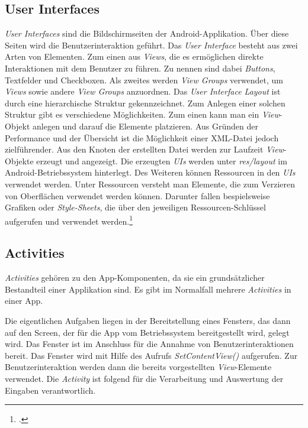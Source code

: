 \subsection{User Interfaces}
\label{ssec:android-ui}
\textit{User Interfaces} sind die Bildschirmseiten der Android-Applikation. Über diese Seiten wird die Benutzerinteraktion geführt. Das \textit{User Interface} besteht aus zwei Arten von Elementen. Zum einen aus \textit{Views}, die es ermöglichen direkte Interaktionen mit dem Benutzer zu führen. Zu nennen sind dabei \textit{Buttons}, Textfelder und Checkboxen. Als zweites werden \textit{View Groups} verwendet, um \textit{Views} sowie andere \textit{View Groups} anzuordnen.
Das \textit{User Interface Layout} ist durch eine hierarchische Struktur gekennzeichnet. Zum Anlegen einer solchen Struktur gibt es verschiedene Möglichkeiten. Zum einen kann man ein \textit{View}-Objekt anlegen und darauf die Elemente platzieren. Aus Gründen der Performance und der Übersicht ist die Möglichkeit einer \ac{XML}-Datei jedoch zielführender. Aus den Knoten der erstellten Datei werden zur Laufzeit \textit{View}-Objekte erzeugt und angezeigt. Die erzeugten \textit{UIs} werden unter \textit{res/layout} im Android-Betriebssystem hinterlegt. Des Weiteren können Ressourcen in den \textit{UIs} verwendet werden. Unter Ressourcen versteht man Elemente, die zum Verzieren von Oberflächen verwendet werden können. Darunter fallen bespielsweise Grafiken oder \textit{Style-Sheets}, die über den jeweiligen Ressourcen-Schlüssel aufgerufen und verwendet werden.\footcite{Android-UI}

\subsection{Activities}
\label{ssec:android-activities}
\textit{Activities} gehören zu den App-Komponenten, da sie ein grundsätzlicher Bestandteil einer Applikation sind. Es gibt im Normalfall mehrere \textit{Activities} in einer App.

Die eigentlichen Aufgaben liegen in der Bereitstellung eines Fensters, das dann auf den Screen, der für die App vom Betriebssystem bereitgestellt wird, gelegt wird. Das Fenster ist im Anschluss für die Annahme von Benutzerinteraktionen bereit. Das Fenster wird mit Hilfe des Aufrufs \textit{SetContentView()} aufgerufen. Zur Benutzerinteraktion werden dann die bereits vorgestellten \textit{View}-Elemente verwendet. Die \textit{Activity} ist folgend für die Verarbeitung und Auswertung der Eingaben verantwortlich.

